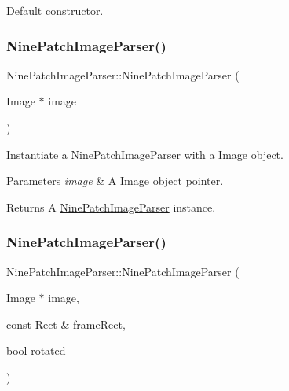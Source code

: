 Default constructor. \mbox{\label{classNinePatchImageParser_a64d01b936897a64a9cd6c5325c01f074}} 
\subsubsection{\texorpdfstring{Nine\+Patch\+Image\+Parser()}{NinePatchImageParser()}\hspace{0.1cm}{\footnotesize\ttfamily [2/6]}}
{\footnotesize\ttfamily Nine\+Patch\+Image\+Parser\+::\+Nine\+Patch\+Image\+Parser (\begin{DoxyParamCaption}\item[{Image $\ast$}]{image }\end{DoxyParamCaption})\hspace{0.3cm}{\ttfamily [explicit]}}

Instantiate a \hyperlink{classNinePatchImageParser}{Nine\+Patch\+Image\+Parser} with a Image object.


\begin{DoxyParams}{Parameters}
{\em image} & A Image object pointer.\\
\hline
\end{DoxyParams}
\begin{DoxyReturn}{Returns}
A \hyperlink{classNinePatchImageParser}{Nine\+Patch\+Image\+Parser} instance. 
\end{DoxyReturn}
\mbox{\label{classNinePatchImageParser_af6a7854a94eb39c9881b90b5c1c04e0f}} 
\subsubsection{\texorpdfstring{Nine\+Patch\+Image\+Parser()}{NinePatchImageParser()}\hspace{0.1cm}{\footnotesize\ttfamily [3/6]}}
{\footnotesize\ttfamily Nine\+Patch\+Image\+Parser\+::\+Nine\+Patch\+Image\+Parser (\begin{DoxyParamCaption}\item[{Image $\ast$}]{image,  }\item[{const \hyperlink{classRect}{Rect} \&}]{frame\+Rect,  }\item[{bool}]{rotated }\end{DoxyParamCaption})}

